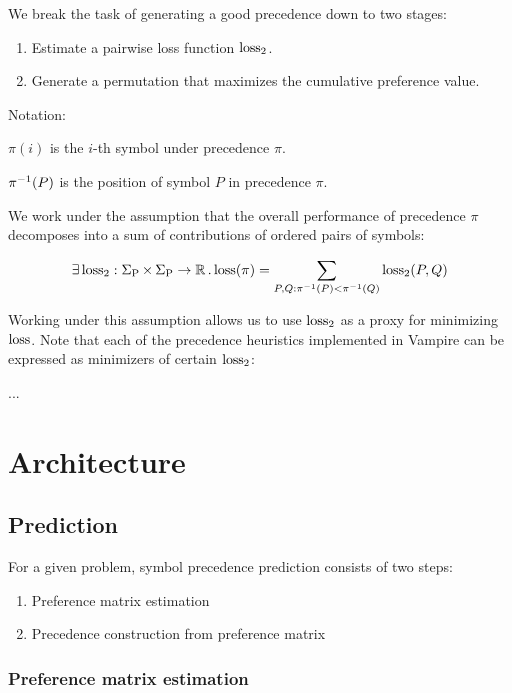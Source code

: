 We break the task of generating a good precedence down to two stages:

\begin{enumerate}
	\item Estimate a pairwise loss function \(\operatorname{loss}_2\).
	\item Generate a permutation that maximizes the cumulative preference value.
\end{enumerate}

Notation:

\(\pi(i)\) is the \(i\)-th symbol under precedence \(\pi\).

\(\pi^{-1}(P)\) is the position of symbol \(P\) in precedence \(\pi\).

We work under the assumption that the overall performance of precedence \(\pi\) decomposes into a sum of contributions of ordered pairs of symbols:

\begin{align*}
\exists \operatorname{loss}_2 : \operatorname{\Sigma_P} \times \operatorname{\Sigma_P} \rightarrow \operatorname{\mathbb{R}} . \operatorname{loss}(\pi) = \sum_{P, Q: \pi^{-1}(P) < \pi^{-1}(Q)} \operatorname{loss}_2(P, Q)
\end{align*}

Working under this assumption allows us to use \(\operatorname{loss}_2\) as a proxy for minimizing \(\operatorname{loss}\).
Note that each of the precedence heuristics implemented in Vampire can be expressed as minimizers of certain \(\operatorname{loss}_2\):

...



\section{Architecture}

\subsection{Prediction}

For a given problem, symbol precedence prediction consists of two steps:

\begin{enumerate}
	\item Preference matrix estimation
	\item Precedence construction from preference matrix
\end{enumerate}

\subsubsection{Preference matrix estimation}

